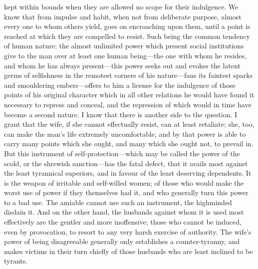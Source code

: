 \documentclass[12pt]{report}
\begin{document}
kept within bounds when they are allowed no scope for their indulgence. We know that from impulse and habit, when not from deliberate purpose, almost every one to whom others yield, goes on encroaching upon them, until a point is reached at which they are compelled to resist. Such being the common tendency of human nature; the almost unlimited power which present social institutions give to the man over at least one human being—the one with whom he resides, and whom he has always present—this power seeks out and evokes the latent germs of selfishness in the remotest corners of his nature—fans its faintest sparks and smouldering embers—offers to him a license for the indulgence of those points of his original character which in all other relations he would have found it necessary to repress and conceal, and the repression of which would in time have become a second nature. I know that there is another side to the question. I grant that the wife, if she cannot effectually resist, can at least retaliate; she, too, can make the man's life extremely uncomfortable, and by that power is able to carry many points which she ought, and many which she ought not, to prevail in. But this instrument of self-protection—which may be called the power of the scold, or the shrewish sanction—has the fatal defect, that it avails most against the least tyrannical superiors, and in favour of the least deserving dependents. It is the weapon of irritable and self-willed women; of those who would make the worst use of power if they themselves had it, and who generally turn this power to a bad use. The amiable cannot use such an instrument, the highminded disdain it. And on the other hand, the husbands against whom it is used most effectively are the gentler and more inoffensive; those who cannot be induced, even by provocation, to resort to any very harsh exercise of authority. The wife's power of being disagreeable generally only establishes a counter-tyranny, and makes victims in their turn chiefly of those husbands who are least inclined to be tyrants.
\end{document}
